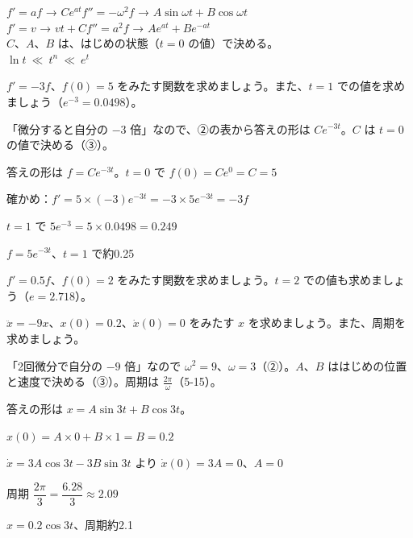 \begin{taisetsu}
\def\tsl#1{\makebox[5.2\zw][l]{\sffamily\bfseries\small\color{bkTheme}#1}}
\tsl{答えの候補}$f'=af$ → $Ce^{at}$\qquad $f''=-\omega^2f$ → $A\sin\omega t+B\cos\omega t$\\[3pt]
\tsl{}$f'=v$ → $vt+C$\qquad $f''=a^2f$ → $Ae^{at}+Be^{-at}$\\[3pt]
\tsl{数の決め方}$C$、$A$、$B$ は、はじめの状態（$t=0$ の値）で決める。\\[3pt]
\tsl{ふえ方}$\ln t\ \ll\ t^n\ \ll\ e^t$
\end{taisetsu}

\begin{kotoba}
\small
{}
\end{kotoba}


\begin{reidai}[自分に比例してへる]
$f'=-3f$、$f(0)=5$ をみたす関数を求めましょう。また、$t=1$ での値を求めましょう（$e^{-3}=0.0498$）。\par
\kangaekata 「微分すると自分の $-3$ 倍」なので、②の表から答えの形は $Ce^{-3t}$。$C$ は $t=0$ の値で決める（③）。\par
\shiki 答えの形は $f=Ce^{-3t}$。$t=0$ で $f(0)=Ce^0=C=5$\par
\hspace*{2.6\zw}確かめ：$f'=5\times(-3)e^{-3t}=-3\times5e^{-3t}=-3f$\par
\hspace*{2.6\zw}$t=1$ で $5e^{-3}=5\times0.0498=0.249$\par
\kotae $f=5e^{-3t}$、$t=1$ で約0.25
\end{reidai}

\begin{jibun}
$f'=0.5f$、$f(0)=2$ をみたす関数を求めましょう。$t=2$ での値も求めましょう（$e=2.718$）。
\end{jibun}

\begin{reidai}[ゆれる動きを決める]
$\ddot{x}=-9x$、$x(0)=0.2$、$\dot{x}(0)=0$ をみたす $x$ を求めましょう。また、周期を求めましょう。\par
\kangaekata 「2回微分で自分の $-9$ 倍」なので $\omega^2=9$、$\omega=3$（②）。$A$、$B$ ははじめの位置と速度で決める（③）。周期は $\frac{2\pi}{\omega}$（5-15）。\par
\shiki 答えの形は $x=A\sin3t+B\cos3t$。\par
\hspace*{2.6\zw}$x(0)=A\times0+B\times1=B=0.2$\par
\hspace*{2.6\zw}$\dot{x}=3A\cos3t-3B\sin3t$ より $\dot{x}(0)=3A=0$、$A=0$\par
\hspace*{2.6\zw}周期 $\dfrac{2\pi}{3}=\dfrac{6.28}{3}\approx2.09$\par
\kotae $x=0.2\cos3t$、周期約2.1
\end{reidai}

